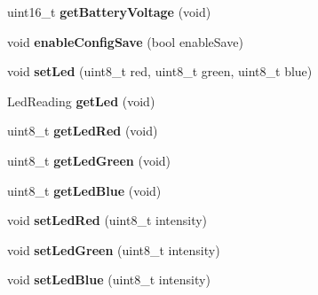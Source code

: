 \begin{DoxyCompactItemize}
\item 
\hypertarget{class_bean_class_a862784d57eca8dd368172612e5e792de}{}uint16\+\_\+t {\bfseries get\+Battery\+Voltage} (void)\label{class_bean_class_a862784d57eca8dd368172612e5e792de}

\item 
\hypertarget{class_bean_class_a2ae5aa1b912ca67715670f1dea865431}{}void {\bfseries enable\+Config\+Save} (bool enable\+Save)\label{class_bean_class_a2ae5aa1b912ca67715670f1dea865431}

\item 
\hypertarget{class_bean_class_a7af1f9d1edb112f761db9b69686b5a5a}{}void {\bfseries set\+Led} (uint8\+\_\+t red, uint8\+\_\+t green, uint8\+\_\+t blue)\label{class_bean_class_a7af1f9d1edb112f761db9b69686b5a5a}

\item 
\hypertarget{class_bean_class_a131bd8f27166e4f8baa991a687941fc9}{}Led\+Reading {\bfseries get\+Led} (void)\label{class_bean_class_a131bd8f27166e4f8baa991a687941fc9}

\item 
\hypertarget{class_bean_class_aea8736bf91c03de609233ddb270fb77d}{}uint8\+\_\+t {\bfseries get\+Led\+Red} (void)\label{class_bean_class_aea8736bf91c03de609233ddb270fb77d}

\item 
\hypertarget{class_bean_class_a5619292a562731e94f97e93432ab3639}{}uint8\+\_\+t {\bfseries get\+Led\+Green} (void)\label{class_bean_class_a5619292a562731e94f97e93432ab3639}

\item 
\hypertarget{class_bean_class_a8dcd68a87dc75dd0fe912483cc05fa43}{}uint8\+\_\+t {\bfseries get\+Led\+Blue} (void)\label{class_bean_class_a8dcd68a87dc75dd0fe912483cc05fa43}

\item 
\hypertarget{class_bean_class_adfc2642320c53819c83bbaa59bbcef9b}{}void {\bfseries set\+Led\+Red} (uint8\+\_\+t intensity)\label{class_bean_class_adfc2642320c53819c83bbaa59bbcef9b}

\item 
\hypertarget{class_bean_class_ae1955c0312d1fa90bfeb847dada48c8c}{}void {\bfseries set\+Led\+Green} (uint8\+\_\+t intensity)\label{class_bean_class_ae1955c0312d1fa90bfeb847dada48c8c}

\item 
\hypertarget{class_bean_class_ac09c0f3cea6025e2e12e8b6c5419434b}{}void {\bfseries set\+Led\+Blue} (uint8\+\_\+t intensity)\label{class_bean_class_ac09c0f3cea6025e2e12e8b6c5419434b}


\end{DoxyCompactItemize}
